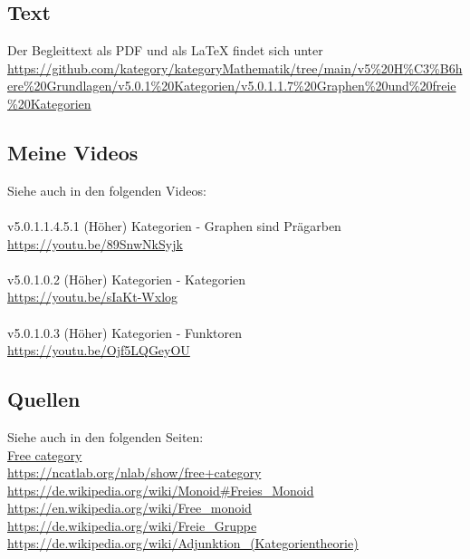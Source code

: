 \documentclass[a4paper]{amsart}
\theoremstyle{definition}
\begin{document}
\subsection*{Text}
Der Begleittext als PDF und als LaTeX findet sich unter
{\tiny
   \url{https://github.com/kategory/kategoryMathematik/tree/main/v5%20H%C3%B6here%20Grundlagen/v5.0.1%20Kategorien/v5.0.1.1.7%20Graphen%20und%20freie%20Kategorien}
}

\subsection*{Meine Videos}
Siehe auch in den folgenden Videos:\\
\\
v5.0.1.1.4.5.1 (Höher) Kategorien - Graphen sind Prägarben\\
\url{https://youtu.be/89SnwNkSyjk}\\
\\
v5.0.1.0.2 (Höher) Kategorien - Kategorien\\
\url{https://youtu.be/sIaKt-Wxlog}\\
\\
v5.0.1.0.3 (Höher) Kategorien - Funktoren\\
\url{https://youtu.be/Ojf5LQGeyOU}\\

\subsection*{Quellen}
Siehe auch in den folgenden Seiten:\\
\url{Free category}\\
\url{https://ncatlab.org/nlab/show/free+category}\\
\url{https://de.wikipedia.org/wiki/Monoid#Freies_Monoid}\\
\url{https://en.wikipedia.org/wiki/Free_monoid}\\
\url{https://de.wikipedia.org/wiki/Freie_Gruppe}\\
\url{https://de.wikipedia.org/wiki/Adjunktion_(Kategorientheorie)}
\end{document}

